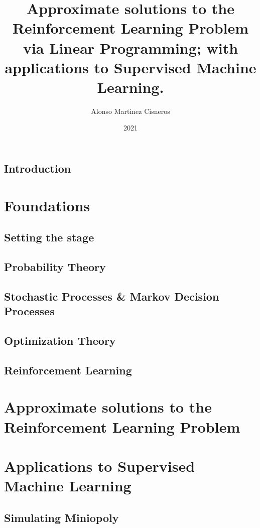 \documentclass[colorful]{sty/itam-thesis}
\author{Alonso Martinez Cisneros}
\title{Approximate solutions to the Reinforcement Learning 
Problem via Linear Programming; with applications to Supervised 
Machine Learning.}
\date{2021}
\begin{document}
\frontmatter
{}
\maketitle
\makefrontmatter

\cleardoublepage
\pagestyle{plain}






\tableofcontents

\mainmatter


% 
\chapter*{Introduction}




\part{Foundations}

\chapter{Setting the stage}


\chapter{Probability Theory}
\chapter{Stochastic Processes \& Markov Decision Processes}
\chapter{Optimization Theory}
\chapter{Reinforcement Learning}

\part{Approximate solutions to the Reinforcement Learning 
Problem}


\part{Applications to Supervised Machine Learning}

\appendix

\chapter{Simulating Miniopoly}


\nocite{*}
\printbibliography
\end{document}

